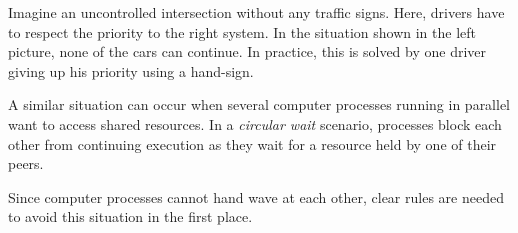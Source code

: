 
Imagine an uncontrolled intersection without any traffic signs. Here, drivers have to respect the priority to the right system. In the situation shown in the left picture, none of the cars can continue. In practice, this is solved by one driver giving up his priority using a hand-sign.

A similar situation can occur when several computer processes running in parallel want to access shared resources. In a \emph{circular wait} scenario, processes block each other from continuing execution as they wait for a resource held by one of their peers.

Since computer processes cannot hand wave at each other, clear rules are needed to avoid this situation in the first place.

